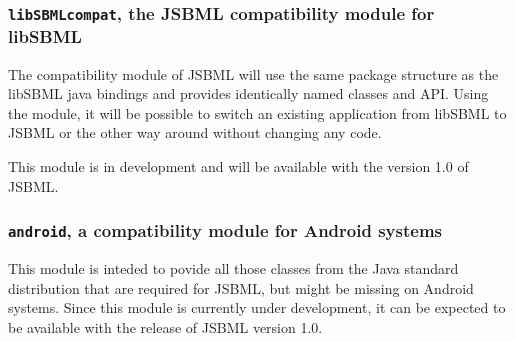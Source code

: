 \subsubsection{\texttt{libSBMLcompat}, the JSBML compatibility module for
libSBML}

The compatibility module of JSBML will use the same package structure as the
libSBML java bindings and provides identically named classes and API. Using the
module, it will be possible to switch an existing application from libSBML to
JSBML or the other way around without changing any code.

This module is in development and will be available with the version 1.0 of
JSBML.
%



\subsubsection{\texttt{android}, a compatibility module for Android systems}
This module is inteded to povide all those classes from the Java\texttrademark{}
standard distribution that are required for JSBML, but might be missing on
Android systems. Since this module is currently under development, it can be
expected to be available with the release of JSBML version 1.0.
